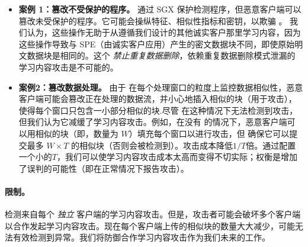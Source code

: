 \begin{itemize}[leftmargin=*]
  \item {\bf 案例 1：篡改不受保护的程序。}
    \sysnameF 通过 SGX 保护检测程序，但恶意客户端可以篡改未受保护的程序。它可能会操纵特征、相似性指标和密钥，以欺骗 \sysnameF。
    我们认为，这些操作无助于从遵循我们设计的其他诚实客户那里学习内容，因为这些操作导致与 SPE（由诚实客户应用）产生的密文数据块不同，即使原始明文数据块是相同的。这个 {\em 禁止重复数据删除}，依赖重复数据删除模式泄漏的学习内容攻击是不可能的。
  \item {\bf 案例2：篡改数据处理。}
    由于 \sysnameF 在每个处理窗口的粒度上监控数据相似性，恶意客户端可能会篡改正在处理的数据流，并小心地插入相似的块（用于攻击），使得每个窗口只包含一小部分相似的块.尽管 \sysnameF 在这种情况下无法检测到攻击，但我们认为它减缓了学习内容攻击。例如，在没有 \sysnameF 的情况下，恶意客户端可以用相似的块（即，数量为 $W$）填充每个窗口以进行攻击，但 \sysnameF 确保它可以提交最多 $W\times T$ 的相似块（否则会被检测到）。攻击成本降低$1/T$倍。通过配置一个小的$T$，我们可以使学习内容攻击成本太高而变得不切实际；权衡是增加了误判的可能性（即在正常情况下报告攻击）。
\end{itemize}
  
  
  
  \paragraph*{限制。}
  \sysnameF 检测来自每个 {\em 独立} 客户端的学习内容攻击。但是，攻击者可能会破坏多个客户端以合作发起学习内容攻击。现在每个客户端上传的相似块的数量大大减少，\sysnameF 可能无法有效检测到异常。我们将防御合作学习内容攻击作为我们未来的工作。